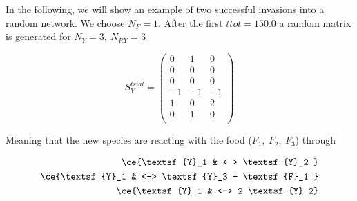 \documentclass{article}
\begin{document}

In the following, we will show an example of two successful invasions into a random network. We choose $N_F=1$. After the first $ttot=150.0$ a random matrix is generated for $N_Y=3, \ N_{RY}=3$

\begin{center}
\begin{equation}
    S^{trial}_Y = \begin{pmatrix}
        0 & 1 & 0 \\
0 & 0 & 0 \\
0 & 0 & 0 \\
-1 & -1 & -1 \\
1 & 0 & 2 \\
0 & 1 & 0 \\
         \end{pmatrix}
\end{equation}
\end{center}

Meaning that the new species are reacting with the food ($F_1, \ F_2, \ F_3$) through

\begin{equation}
		\begin{split}
\ce{\textsf{Y}_1 & <--> \textsf{Y}_2 }\\ 
\ce{\textsf{Y}_1 & <--> \textsf{Y}_3 + \textsf{F}_1 }\\ 
\ce{\textsf{Y}_1 & <--> 2 \textsf{Y}_2}\\ 
\end{split} 
\end{equation}
\\
\end{document}
